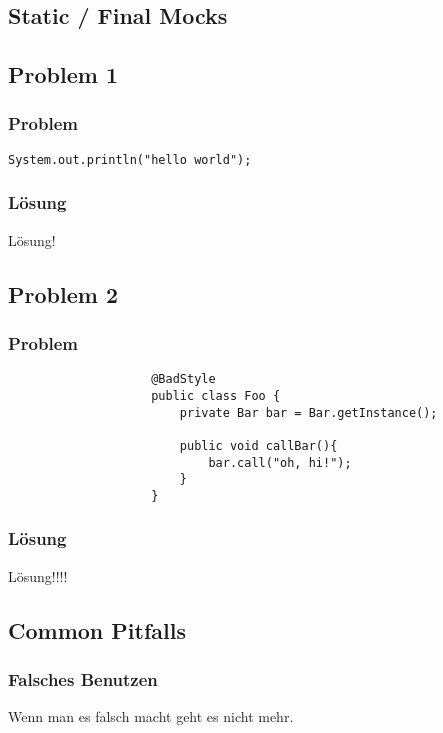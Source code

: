 \documentclass{beamer}
\begin{document}
		\subsection{Static / Final Mocks}

		\subsection{Problem 1}

			\begin{frame}
				\frametitle{Problem}
				\lstinline|System.out.println("hello world");|
			\end{frame}

			\begin{frame}
				\frametitle{Lösung}
				Lösung!
			\end{frame}


		\subsection{Problem 2}

			\begin{frame}[fragile]
				\frametitle{Problem}

				\begin{lstlisting}
					@BadStyle
					public class Foo {
					    private Bar bar = Bar.getInstance();

					    public void callBar(){
					        bar.call("oh, hi!");
					    }
					}
				\end{lstlisting}

			\end{frame}

			\begin{frame}
				\frametitle{Lösung}
				Lösung!!!!
			\end{frame}

		\subsection{Common Pitfalls}

			\begin{frame}
				\frametitle{Falsches Benutzen}
				Wenn man es falsch macht geht es nicht mehr.
			\end{frame}
\end{document}
